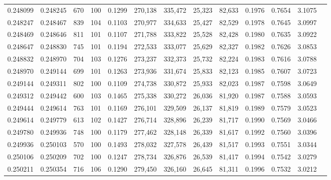 \begin{tabular}{rrrrrrrrrrrrr}
0.248099 & 0.248245 &   670 & 100 &                                     0.1299 & 270,138 & 335,472 &  25,323 &  82,633 & 0.1976 & 0.7654 & 3.1075 \\
0.248247 & 0.248467 &   839 & 104 &                                     0.1103 & 270,977 & 334,633 &  25,427 &  82,529 & 0.1978 & 0.7645 & 3.0997 \\
0.248469 & 0.248646 &   811 & 101 &                                     0.1107 & 271,788 & 333,822 &  25,528 &  82,428 & 0.1980 & 0.7635 & 3.0922 \\
0.248647 & 0.248830 &   745 & 101 &                                     0.1194 & 272,533 & 333,077 &  25,629 &  82,327 & 0.1982 & 0.7626 & 3.0853 \\
0.248832 & 0.248970 &   704 & 103 &                                     0.1276 & 273,237 & 332,373 &  25,732 &  82,224 & 0.1983 & 0.7616 & 3.0788 \\
0.248970 & 0.249144 &   699 & 101 &                                     0.1263 & 273,936 & 331,674 &  25,833 &  82,123 & 0.1985 & 0.7607 & 3.0723 \\
0.249144 & 0.249311 &   802 & 100 &                                     0.1109 & 274,738 & 330,872 &  25,933 &  82,023 & 0.1987 & 0.7598 & 3.0649 \\
0.249312 & 0.249442 &   600 & 103 &                                     0.1465 & 275,338 & 330,272 &  26,036 &  81,920 & 0.1987 & 0.7588 & 3.0593 \\
0.249444 & 0.249614 &   763 & 101 &                                     0.1169 & 276,101 & 329,509 &  26,137 &  81,819 & 0.1989 & 0.7579 & 3.0523 \\
0.249614 & 0.249779 &   613 & 102 &                                     0.1427 & 276,714 & 328,896 &  26,239 &  81,717 & 0.1990 & 0.7569 & 3.0466 \\
0.249780 & 0.249936 &   748 & 100 &                                     0.1179 & 277,462 & 328,148 &  26,339 &  81,617 & 0.1992 & 0.7560 & 3.0396 \\
0.249936 & 0.250103 &   570 & 100 &                                     0.1493 & 278,032 & 327,578 &  26,439 &  81,517 & 0.1993 & 0.7551 & 3.0344 \\
0.250106 & 0.250209 &   702 & 100 &                                     0.1247 & 278,734 & 326,876 &  26,539 &  81,417 & 0.1994 & 0.7542 & 3.0279 \\
0.250211 & 0.250354 &   716 & 106 &                                     0.1290 & 279,450 & 326,160 &  26,645 &  81,311 & 0.1996 & 0.7532 & 3.0212 \\

\end{tabular}
